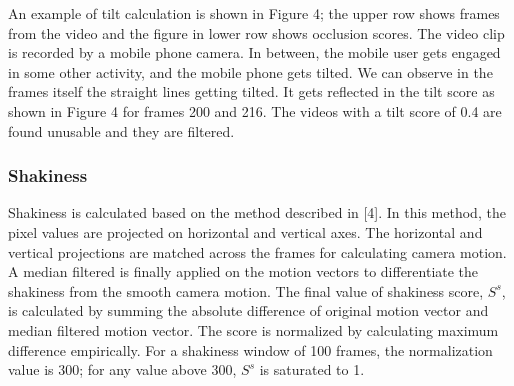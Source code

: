 \documentclass{sig-alternate}
\begin{document}
An example of tilt calculation is shown in Figure 4; the upper
row shows frames from the video and the figure in lower row shows
occlusion scores. The video clip is recorded by a mobile phone
camera. In between, the mobile user gets engaged in some other
activity, and the mobile phone gets tilted. We can observe in the
frames itself the straight lines getting tilted. It gets reflected in the
tilt score as shown in Figure 4 for frames 200 and 216. The videos
with a tilt score of 0.4 are found unusable and they are filtered.

\subsubsection{Shakiness}
Shakiness is calculated based on the method described in [4].
In this method, the pixel values are projected on horizontal and
vertical axes. The horizontal and vertical projections are matched
across the frames for calculating camera motion. A median filtered
is finally applied on the motion vectors to differentiate the shakiness
from the smooth camera motion. The final value of shakiness
score, $S^s$, is calculated by summing the absolute difference of original
motion vector and median filtered motion vector. The score is
normalized by calculating maximum difference empirically. For a
shakiness window of 100 frames, the normalization value is 300;
for any value above 300, $S^s$ is saturated to 1.
\end{document}

